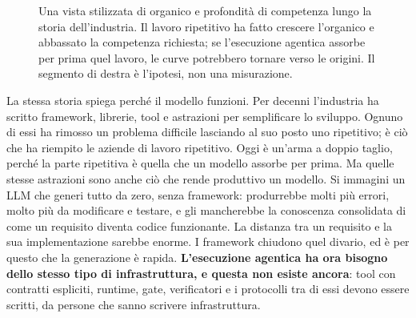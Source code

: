\documentclass[10pt,oneside,openany]{book}
\begin{document}
\begin{figure}[!htbp]
\centering
{}
\caption{Una vista stilizzata di organico e profondità di competenza lungo la storia dell'industria. Il lavoro ripetitivo ha fatto crescere l'organico e abbassato la competenza richiesta; se l'esecuzione agentica assorbe per prima quel lavoro, le curve potrebbero tornare verso le origini. Il segmento di destra è l'ipotesi, non una misurazione.}
\label{fig:skill-curve}
\end{figure}

La stessa storia spiega perché il modello funzioni. Per decenni l'industria ha scritto framework, librerie, tool e astrazioni per semplificare lo sviluppo. Ognuno di essi ha rimosso un problema difficile lasciando al suo posto uno ripetitivo; è ciò che ha riempito le aziende di lavoro ripetitivo. Oggi è un'arma a doppio taglio, perché la parte ripetitiva è quella che un modello assorbe per prima. Ma quelle stesse astrazioni sono anche ciò che rende produttivo un modello. Si immagini un LLM che generi tutto da zero, senza framework: produrrebbe molti più errori, molto più da modificare e testare, e gli mancherebbe la conoscenza consolidata di come un requisito diventa codice funzionante. La distanza tra un requisito e la sua implementazione sarebbe enorme. I framework chiudono quel divario, ed è per questo che la generazione è rapida. \textbf{L'esecuzione agentica ha ora bisogno dello stesso tipo di infrastruttura, e questa non esiste ancora}: tool con contratti espliciti, runtime, gate, verificatori e i protocolli tra di essi devono essere scritti, da persone che sanno scrivere infrastruttura.
\end{document}
